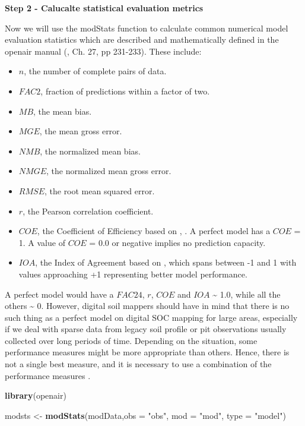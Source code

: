 \documentclass[10pt,b5paper,]{book}
\newenvironment{Shaded}{\begin{snugshade}}{\end{snugshade}}
\newcommand{\DataTypeTok}[1]{\textcolor[rgb]{0.13,0.29,0.53}{#1}}
\newcommand{\KeywordTok}[1]{\textcolor[rgb]{0.13,0.29,0.53}{\textbf{#1}}}
\newcommand{\NormalTok}[1]{#1}
\newcommand{\StringTok}[1]{\textcolor[rgb]{0.31,0.60,0.02}{#1}}
\providecommand{\tightlist}{%
  \setlength{\itemsep}{0pt}\setlength{\parskip}{0pt}}
\theoremstyle{definition}
\theoremstyle{definition}
\theoremstyle{definition}
\theoremstyle{remark}
\begin{document}
\textbf{Step 2 - Calucalte statistical evaluation metrics}

Now we will use the modStats function to calculate common numerical
model evaluation statistics which are described and mathematically
defined in the openair manual (\citet{carslaw2015openair}, Ch. 27, pp
231-233). These include:

\begin{itemize}
\tightlist
\item
  \(n\), the number of complete pairs of data.
\item
  \(FAC2\), fraction of predictions within a factor of two.
\item
  \(MB\), the mean bias.
\item
  \(MGE\), the mean gross error.
\item
  \(NMB\), the normalized mean bias.
\item
  \(NMGE\), the normalized mean gross error.
\item
  \(RMSE\), the root mean squared error.
\item
  \(r\), the Pearson correlation coefficient.
\item
  \(COE\), the Coefficient of Efficiency based on
  \citet{legates1999evaluating}, \citet{legates2013refined}. A perfect
  model has a \(COE\) = 1. A value of \(COE\) = 0.0 or negative implies
  no prediction capacity.
\item
  \(IOA\), the Index of Agreement based on \citet{willmott2012refined},
  which spans between -1 and 1 with values approaching +1 representing
  better model performance.
\end{itemize}

A perfect model would have a \(FAC24\), \(r\), \(COE\) and \(IOA\)
\textasciitilde{} 1.0, while all the others \textasciitilde{} 0.
However, digital soil mappers should have in mind that there is no such
thing as a perfect model on digital SOC mapping for large areas,
especially if we deal with sparse data from legacy soil profile or pit
observations usually collected over long periods of time. Depending on
the situation, some performance measures might be more appropriate than
others. Hence, there is not a single best measure, and it is necessary
to use a combination of the performance measures \citep{chang2004air}.

\begin{Shaded}
\begin{Highlighting}[]
\KeywordTok{library}\NormalTok{(openair)}

\NormalTok{modsts <-}\StringTok{ }\KeywordTok{modStats}\NormalTok{(modData,}\DataTypeTok{obs =} \StringTok{"obs"}\NormalTok{, }\DataTypeTok{mod =} \StringTok{"mod"}\NormalTok{, }\DataTypeTok{type =} \StringTok{"model"}\NormalTok{)}
\end{Highlighting}
\end{Shaded}
\end{document}
